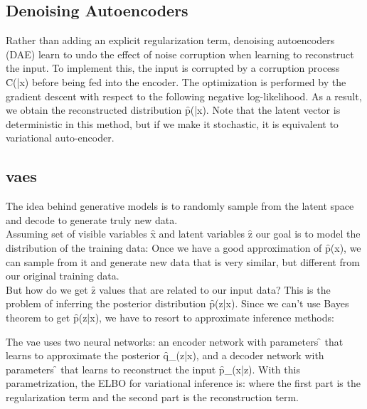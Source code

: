 \subsection{Denoising Autoencoders}
Rather than adding an explicit regularization term, denoising autoencoders (DAE) learn to undo the effect of noise corruption when learning to reconstruct the input. To implement this, the input is corrupted by a corruption process \f{C(|x)} before being fed into the encoder. The optimization is performed by the gradient descent with respect to the following negative log-likelihood. As a result, we obtain the reconstructed distribution \f{p(|x)}. Note that the latent vector is deterministic in this method, but if we make it stochastic, it is equivalent to variational auto-encoder.


\subsection{\acp{vae}}
The idea behind generative models is to randomly sample from the latent space and decode to generate truly new data.\\
Assuming set of visible variables \f{x} and latent variables \f{z} our goal is to model the
distribution of the training data:
Once we have a good approximation of \f{p(x)}, we can sample from it and generate new
data that is very similar, but different from our original training data.\\

But how do we get \f{z} values that are related to our input data? This is the problem of inferring the posterior distribution \f{p(z|x)}. Since we can't use Bayes theorem to get \f{p(z|x)}, we have to resort to approximate inference methods:


The \ac{vae} uses two neural networks: an encoder network with parameters \f{\phi} that learns to approximate the posterior \f{q_\phi(z|x)}, and a decoder network with parameters
\f{\theta} that learns to reconstruct the input \f{p_\theta(x|z)}. With this parametrization, the ELBO for variational inference is:
where the first part is the regularization term and the second part is the reconstruction term.\\

